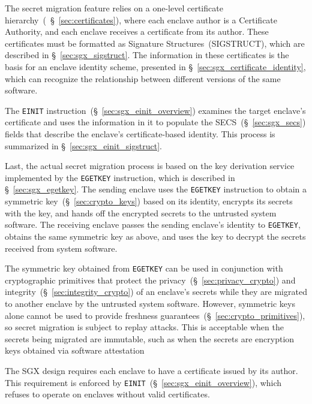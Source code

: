 The secret migration feature relies on a one-level certificate
hierarchy~(~\S~\ref{sec:certificates}), where each enclave author is a
Certificate Authority, and each enclave receives a certificate from its author.
These certificates must be formatted as Signature Structures~(SIGSTRUCT), which
are described in \S~\ref{sec:sgx_sigstruct}. The information in these
certificates is the basis for an enclave identity scheme, presented in
\S~\ref{sec:sgx_certificate_identity}, which can recognize the relationship
between different versions of the same software.

The \texttt{EINIT} instruction~(\S~\ref{sec:sgx_einit_overview}) examines the
target enclave's certificate and uses the information in it to populate
the SECS~(\S~\ref{sec:sgx_secs}) fields that describe the enclave's
certificate-based identity. This process is summarized in
\S~\ref{sec:sgx_einit_sigstruct}.

Last, the actual secret migration process is based on the key derivation
service implemented by the \texttt{EGETKEY} instruction, which is described
in \S~\ref{sec:sgx_egetkey}. The sending enclave uses the \texttt{EGETKEY}
instruction to obtain a symmetric key~(\S~\ref{sec:crypto_keys}) based on its
identity, encrypts its secrets with the key, and hands off the encrypted
secrets to the untrusted system software. The receiving enclave passes the
sending enclave's identity to \texttt{EGETKEY}, obtains the same symmetric key
as above, and uses the key to decrypt the secrets received from system
software.

The symmetric key obtained from \texttt{EGETKEY} can be used in conjunction
with cryptographic primitives that protect the
privacy~(\S~\ref{sec:privacy_crypto}) and
integrity~(\S~\ref{sec:integrity_crypto}) of an enclave's secrets while they
are migrated to another enclave by the untrusted system software. However,
symmetric keys alone cannot be used to provide freshness
guarantees~(\S~\ref{sec:crypto_primitives}), so secret migration is subject to
replay attacks. This is acceptable when the secrets being migrated are
immutable, such as when the secrets are encryption keys obtained via software
attestation


\label{sec:sgx_sigstruct}
\label{sec:sgx_mrsigner}


The SGX design requires each enclave to have a certificate issued by its author.
This requirement is enforced by
\texttt{EINIT}~(\S~\ref{sec:sgx_einit_overview}), which refuses to operate on
enclaves without valid certificates.

